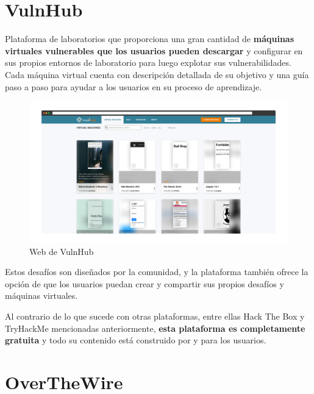         \newpage
    
    
    \section{VulnHub}
    
        Plataforma de laboratorios que proporciona una gran cantidad de \textbf{máquinas virtuales vulnerables que los usuarios pueden descargar} y configurar en sus propios entornos de laboratorio para luego explotar sus vulnerabilidades. Cada máquina virtual cuenta con descripción detallada de su objetivo y una guía paso a paso para ayudar a los usuarios en su proceso de aprendizaje.
        
        \begin{figure}[h]
            \centering

            \includegraphics[width=\textwidth]{images/Capturas/Web de VulnHub.png}

            \caption{Web de VulnHub}
            \label{fig:VulnHub-web}
        \end{figure}
        
        Estos desafíos son diseñados por la comunidad, y la plataforma también ofrece la opción de que los usuarios puedan crear y compartir sus propios desafíos y máquinas virtuales.
        
        Al contrario de lo que sucede con otras plataformas, entre ellas Hack The Box y TryHackMe mencionadas anteriormente, \textbf{esta plataforma es completamente gratuita} y todo su contenido está construido por y para los usuarios.
        
        \newpage
    
    
    \section{OverTheWire}
    
